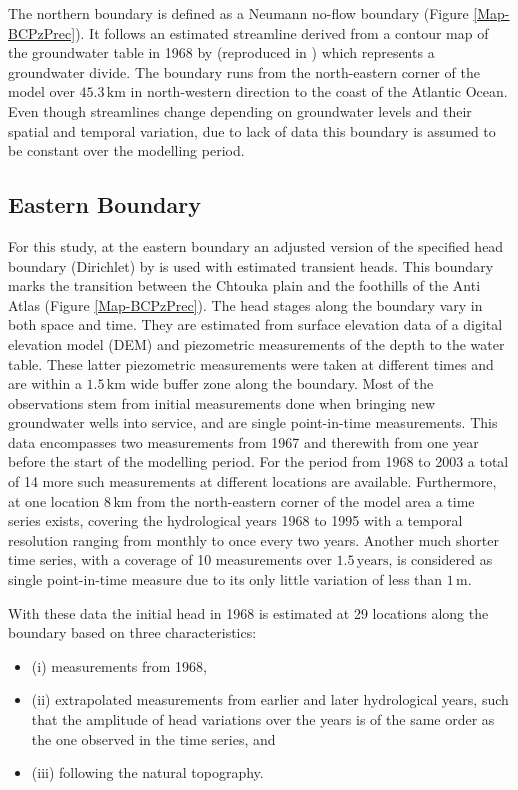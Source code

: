 The northern boundary is defined as a Neumann no-flow boundary (Figure \ref{Map-BCPzPrec}). 
It follows an estimated streamline derived from a contour map of the groundwater table in 1968 by \textcite{Bernet.1968} (reproduced in \cite{Bernet.1977}) which represents a groundwater divide. 
The boundary runs from the north-eastern corner of the model over $45.3 \, \textrm{km}$ in north-western direction to the coast of the Atlantic Ocean. 
Even though streamlines change depending on groundwater levels and their spatial and temporal variation, due to lack of data this boundary is assumed to be constant over the modelling period.

\subsection{Eastern Boundary}

For this study, at the eastern boundary an adjusted version of the specified head boundary (Dirichlet) by \textcite{Horn.2021} is used with estimated transient heads. 
This boundary marks the transition between the Chtouka plain and the foothills of the Anti Atlas (Figure \ref{Map-BCPzPrec}). 
The head stages along the boundary vary in both space and time. 
They are estimated from surface elevation data of a digital elevation model (DEM) \parencite{NASA.SRTM1Arc} and piezometric measurements of the depth to the water table. 
These latter piezometric measurements were taken at different times and are within a $1.5 \, \textrm{km}$ wide buffer zone along the boundary. 
Most of the observations stem from initial measurements done when bringing new groundwater wells into service, and are single point-in-time measurements. 
This data encompasses two measurements from 1967 and therewith from one year before the start of the modelling period. 
For the period from 1968 to 2003 a total of 14 more such measurements at different locations are available. 
Furthermore, at one location $8 \, \textrm{km}$ from the north-eastern corner of the model area a time series exists, covering the hydrological years 1968 to 1995 with a temporal resolution ranging from monthly to once every two years. 
Another much shorter time series, with a coverage of 10 measurements over $1.5 \, \textrm{years}$, is considered as single point-in-time measure due to its only little variation of less than $1 \, \textrm{m}$.

With these data the initial head in 1968 is estimated at 29 locations along the boundary based on three characteristics:
    \begin{itemize}
        \item (i) measurements from 1968,
        \item (ii) extrapolated measurements from earlier and later hydrological years, such that the amplitude of head variations over the years is of the same order as the one observed in the time series, and
        \item (iii) following the natural topography.
    \end{itemize}


